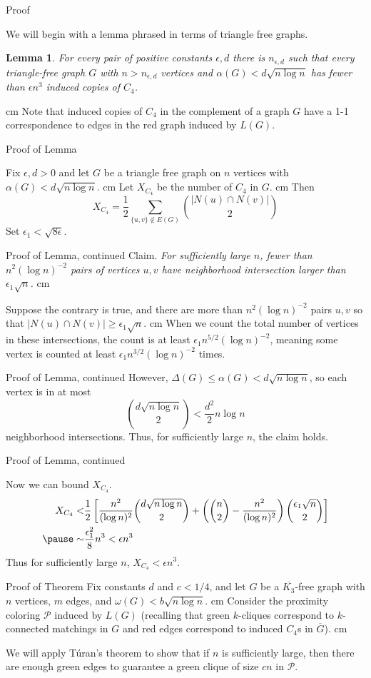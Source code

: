\documentclass{beamer}
\newtheorem{lem}{Lemma}
\newcommand{\blem}[1]{\begin{lem}#1\end{lem}}
\newcommand{\bframe}[2]{\begin{frame}{#1}#2\end{frame}}
\begin{document}
\bframe{Proof}{

We will begin with a lemma phrased in terms of triangle free graphs.\pause
\blem{For every pair of positive constants $\epsilon, d$ there is $n_{\epsilon, d}$ such that every triangle-free graph $G$ with $n > n_{\epsilon, d}$ vertices and $\alpha(G) < d\sqrt{n\log n}$ has fewer than $\epsilon n^3$ induced copies of $C_4$.}\pause \vskip 0.5 cm
Note that induced copies of $C_4$ in the complement of a graph $G$ have a 1-1 correspondence to edges in the red graph induced by $L(G)$.
}

\bframe{Proof of Lemma}{

Fix $\epsilon, d> 0$ and let $G$ be a triangle free graph on $n$ vertices with $\alpha(G) < d\sqrt{n\log n}$. \pause \vskip 0.5 cm
Let $X_{C_4}$ be the number of $C_4$ in $G$. \pause \vskip 0.5 cm 
Then
\[X_{C_4} = \frac{1}{2}\sum_{\{u,v\}\notin E(G)} {|N(u) \cap N(v)| \choose 2}\]\pause
Set $\epsilon_1 < \sqrt{8\epsilon}$.
}

\bframe{Proof of Lemma, continued}{
\noindent Claim. \textit{For sufficiently large $n$, fewer than $n^2(\log n)^{-2}$ pairs of vertices $u,v$ have neighborhood intersection larger than $\epsilon_1\sqrt{n}$.}\pause \vskip 0.5 cm

Suppose the contrary is true, and there are more than $n^2(\log n)^{-2}$ pairs $u,v$ so that $|N(u)\cap N(v)| \geq \epsilon_1\sqrt{n}$. \pause \vskip 0.5 cm
When we count the total number of vertices in these intersections, the count is at least $\epsilon_1n^{5/2}(\log n)^{-2}$, meaning some vertex is counted at least $\epsilon_1n^{3/2}(\log n)^{-2}$ times. 
}

\bframe{Proof of Lemma, continued} {
However, $\Delta(G) \leq \alpha(G) < d\sqrt{n\log n}$, so each vertex is in at most \[{d\sqrt{n\log n}\choose 2 } < \frac{d^2}{2}n\log n\] neighborhood intersections.  Thus, for sufficiently large $n$,  the claim holds.
}

\bframe{Proof of Lemma, continued}{

Now we can bound $X_{C_4}$.\pause
\begin{eqnarray*}X_{C_4} <& \frac{1}{2}\left[\frac{n^2}{(\log n)^2}{d\sqrt{n\log n}\choose 2}+ \left( {n\choose 2}- \frac{n^2}{(\log n)^2}\right){\epsilon_1\sqrt{n}\choose 2}\right]\\\pause
\sim& \frac{\epsilon_1^2}{8}n^3 < \epsilon n^3
\end{eqnarray*}
Thus for sufficiently large $n$, $X_{C_4} < \epsilon n^3$.
}

\bframe{Proof of Theorem}{
\pause
Fix constants $d$ and $c < 1/4$, and let $G$ be a $\overline{K_3}$-free graph with $n$ vertices, $m$ edges, and $\omega(G) < b\sqrt{n\log n}$. \pause \vskip 0.5 cm
Consider the proximity coloring $\mathcal{P}$ induced by $L(G)$ (recalling that green $k$-cliques correspond to $k$-connected matchings in $G$ and red edges correspond to induced $C_4$s in $\overline{G}$). \pause \vskip 0.5 cm

We will apply T\'{u}ran's theorem to show that if $n$ is sufficiently large, then there are enough green edges to guarantee a green clique of size $cn$ in $\mathcal{P}$.

}
\end{document}
